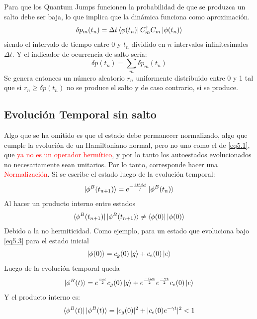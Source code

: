 \documentclass{book}
\begin{document}
Para que los Quantum Jumps funcionen la probabilidad de que se produzca un salto debe ser baja, lo que implica que la dinámica funciona como aproximación. 
\begin{equation}\label{eq5.4}\delta p_m(t_n)=\Delta t \bra{\phi(t_n)}C_m^\dag C_m\ket{\phi(t_n)}\end{equation}
siendo el intervalo de tiempo entre $0$ y $t_n$ dividido en $n$ intervalos infinitesimales $\Delta t$. Y el indicador de ocurrencia de salto sería:
\begin{equation}\label{eq5.5}\delta p(t_n)=\sum_m \delta p_m(t_n)\end{equation}
Se genera entonces un número aleatorio $r_n$ uniformente distribuido entre 0 y 1 tal que si $r_n\geq\delta p(t_n)$ no se produce el salto y de caso contrario, si se produce.\\
\subsection{Evolución Temporal sin salto}
Algo que se ha omitido es que el estado debe permanecer normalizado, algo que cumple la evolución de un Hamiltoniano normal, pero no uno como el de \ref{eq5.1}, que \textcolor{red}{ya no es un operador hermítico}, y por lo tanto los autoestados evolucionados no necesariamente sean unitarios. Por lo tanto, corresponde hacer una \textcolor{red}{Normalización}. Si se escribe el estado luego de la evolución temporal:
\begin{equation}\label{eq5.6}\ket{\phi^B(t_{n+1})}=e^{-\frac{iH\Delta t}{\slash}}\ket{\phi^B(t_{n})}\end{equation}
Al hacer un producto interno entre estados
\begin{equation}\label{eq5.7}\bra{\phi^B(t_{n+1})}\ket{\phi^B(t_{n+1})}\neq\bra{\phi(0)}\ket{\phi(0)}\end{equation} Debido a la no hermiticidad. Como ejemplo, para un estado que evoluciona bajo \ref{eq5.3} para el estado inicial
\begin{equation}\label{eq5.8}\ket{\phi(0)}=c_g(0)\ket{g}+c_e(0)\ket{e}\end{equation}
Luego de la evolución temporal queda 
\begin{equation}\label{eq5.9}\ket{\phi^B(t)}=e^{\frac{i\omega t}{2}}c_g(0)\ket{g}+e^{\frac{-i\omega t}{2}}e^{\frac{-\gamma t}{2}}c_e(0)\ket{e}\end{equation}
Y el producto interno es:
\begin{equation}\label{eq5.10}\bra{\phi^B(t)}\ket{\phi^B(t)}=\lvert c_g(0)\rvert^2+\lvert c_e(0)e^{-\gamma t}\rvert^2 < 1\end{equation}
\end{document}
